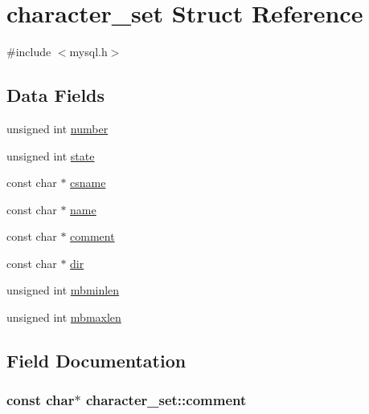 \hypertarget{structcharacter__set}{}\section{character\+\_\+set Struct Reference}
\label{structcharacter__set}


{\ttfamily \#include $<$mysql.\+h$>$}

\subsection*{Data Fields}
\begin{DoxyCompactItemize}
\item 
unsigned int \hyperlink{structcharacter__set_a703a5afa7f12943ff4e5045571830bd6}{number}
\item 
unsigned int \hyperlink{structcharacter__set_aa8979576a32a17e6822feada26528e38}{state}
\item 
const char $\ast$ \hyperlink{structcharacter__set_a37a37221703c72ff69b74042e611fe34}{csname}
\item 
const char $\ast$ \hyperlink{structcharacter__set_a2cd1b8706d20ab062c62d66058b9d919}{name}
\item 
const char $\ast$ \hyperlink{structcharacter__set_a18f0a377ba3ffd7f128c8d1505be6ba1}{comment}
\item 
const char $\ast$ \hyperlink{structcharacter__set_a470078b4604e905ec6d5af9adedffbc4}{dir}
\item 
unsigned int \hyperlink{structcharacter__set_aecc81e5f9910dbfdc4c8bb73080bedd7}{mbminlen}
\item 
unsigned int \hyperlink{structcharacter__set_afb4c0665a9412e678b87d3d76c4be15d}{mbmaxlen}
\end{DoxyCompactItemize}


\subsection{Field Documentation}
\hypertarget{structcharacter__set_a18f0a377ba3ffd7f128c8d1505be6ba1}{}
\subsubsection[{comment}]{\setlength{\rightskip}{0pt plus 5cm}const char$\ast$ character\+\_\+set\+::comment}\label{structcharacter__set_a18f0a377ba3ffd7f128c8d1505be6ba1}
\hypertarget{structcharacter__set_a37a37221703c72ff69b74042e611fe34}{}
